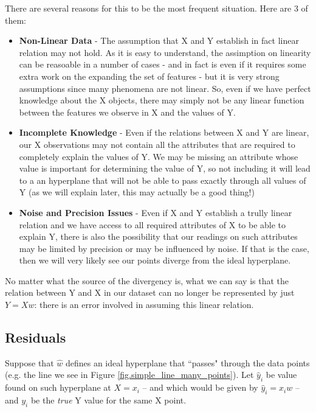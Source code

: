 There are several reasons for this to be the most frequent situation. Here are 3 of them:
\begin{itemize}
\item \textbf{Non-Linear Data} - The assumption that X and Y establish in fact linear relation may not hold. As it is easy to understand, the assimption on linearity can be reasoable in a number of cases - and in fact is even if it requires some extra work on the expanding the set of features - but it is very strong assumptions since many phenomena are not linear. So, even if we have perfect knowledge about the X objects, there may simply not be any linear function between the features we observe in X and the values of Y.
\item \textbf{Incomplete Knowledge} - Even if the relations between X and Y are linear, our X observations may not contain all the attributes that are required to completely explain the values of Y. We may be missing an attribute whose value is important for determining the value of Y, so not including it will lead to a an hyperplane that will not be able to pass exactly through all values of Y (as we will explain later, this may actually be a good thing!)
\item \textbf{Noise and Precision Issues} - Even if X and Y establish a trully linear relation and we have access to all required attributes of X to be able to explain Y, there is also the possibility that our readings on such attributes may be limited by precision or may be influenced by noise. If that is the case, then we will very likely see our points diverge from the ideal hyperplane.
\end{itemize}

No matter what the source of the divergency is, what we can say is that the relation between Y and X in our dataset can no longer be represented by just $Y = X w$: there is an error involved in assuming this linear relation. 


\subsection{Residuals}

Suppose that $\hat{w}$ defines an ideal hyperplane that ``passes" through the data points (e.g. the line we see in Figure \ref{fig.simple_line_many_points}). Let $\hat{y}_i$ be value found on such hyperplane  at $X = x_i$ -- and which would be given by $\hat{y}_i = x_i w$ -- and $y_i$ be the \emph{true} Y value for the same X point. 

